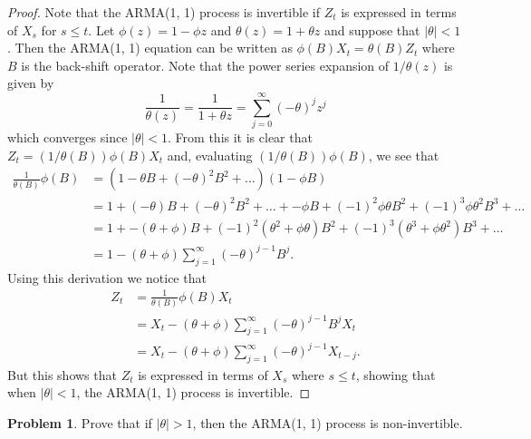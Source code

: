 \documentclass[12pt]{article}
\theoremstyle{definition}
\newtheorem{problem}{Problem}
\begin{document}
\begin{proof}
  Note that the ARMA(1, 1) process is invertible if $Z_t$ is expressed in
  terms of $X_s$ for $s\leq t$. Let $\phi(z) = 1 - \phi z$ and $\theta(z) = 1 + \theta z$
  and suppose that $|\theta| < 1$.
  Then the ARMA(1, 1) equation can be written as $\phi(B)X_t = \theta(B)Z_t$ where
  $B$ is the back-shift operator. Note that the power series expansion of $1/\theta(z)$
  is given by
  \[
    \frac{1}{\theta(z)} = \frac{1}{1+\theta z} = \sum_{j=0}^{\infty} (-\theta)^j z^j
  \]
  which converges since $|\theta| < 1$. From this it is clear that
  $Z_t = (1/\theta(B))\phi(B)X_t$ and, evaluating $(1/\theta(B))\phi(B)$, we see that
  \begin{align*}
    \frac{1}{\theta(B)}\phi(B)
    &= (1 -\theta B + (-\theta)^2 B^2 + \dots )(1 - \phi B)\\
    &= 1 + (-\theta) B + (-\theta)^2 B^2 + \dots + -\phi B + (-1)^2 \phi \theta B^2 + (-1)^3 \phi \theta^2 B^3 + \dots \\
    &= 1 + -(\theta + \phi)B + (-1)^2(\theta^2 + \phi\theta)B^2 + (-1)^3(\theta^3 + \phi\theta^2)B^3 + \dots \\
    &= 1 -(\theta + \phi)\sum_{j=1}^\infty (-\theta)^{j-1}B^{j}.
  \end{align*}
  Using this derivation we notice that
  \begin{align*}
    Z_t
    &= \frac{1}{\theta(B)}\phi(B) X_t \\
    &= X_t -(\theta + \phi)\sum_{j=1}^\infty (-\theta)^{j-1}B^{j}X_t \\
    &= X_t -(\theta + \phi)\sum_{j=1}^\infty (-\theta)^{j-1}X_{t-j}.
  \end{align*}
  But this shows that $Z_t$ is expressed in terms of $X_s$ where $s\leq t$,
  showing that when $|\theta| < 1$, the ARMA(1, 1) process is invertible.
\end{proof}


\begin{problem}
  Prove that if $|\theta| > 1$, then the ARMA(1, 1) process is non-invertible.
\end{problem}
\end{document}
